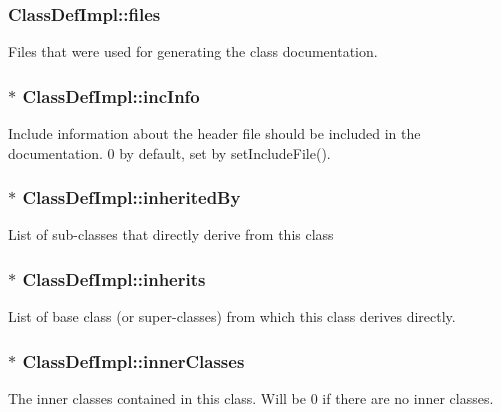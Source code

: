 \subsubsection[{files}]{ Class\+Def\+Impl\+::files}\label{class_class_def_impl_a4d615eed35e81984df99b64bd9334e55}
Files that were used for generating the class documentation. \hypertarget{class_class_def_impl_abff21ee2a293a91dd508f664930ab6bc}{}
\subsubsection[{inc\+Info}]{$\ast$ Class\+Def\+Impl\+::inc\+Info}\label{class_class_def_impl_abff21ee2a293a91dd508f664930ab6bc}
Include information about the header file should be included in the documentation. 0 by default, set by set\+Include\+File(). \hypertarget{class_class_def_impl_a9134929b4e91fa202dad541f7a9c89ac}{}
\subsubsection[{inherited\+By}]{$\ast$ Class\+Def\+Impl\+::inherited\+By}\label{class_class_def_impl_a9134929b4e91fa202dad541f7a9c89ac}
List of sub-\/classes that directly derive from this class \hypertarget{class_class_def_impl_a4dd8dc3a52eaf754b7d567a4dc3e0780}{}
\subsubsection[{inherits}]{$\ast$ Class\+Def\+Impl\+::inherits}\label{class_class_def_impl_a4dd8dc3a52eaf754b7d567a4dc3e0780}
List of base class (or super-\/classes) from which this class derives directly. \hypertarget{class_class_def_impl_a3032dc0d393588b7afd0c2432b350feb}{}
\subsubsection[{inner\+Classes}]{$\ast$ Class\+Def\+Impl\+::inner\+Classes}\label{class_class_def_impl_a3032dc0d393588b7afd0c2432b350feb}
The inner classes contained in this class. Will be 0 if there are no inner classes. \hypertarget{class_class_def_impl_add7ec887a9774fff23c51033b0f68cd1}{}
